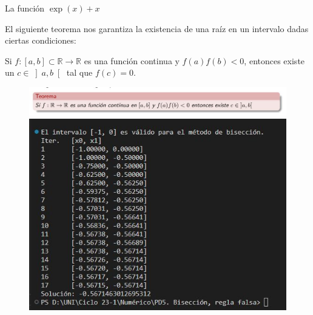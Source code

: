 \begin{frame}
	\begin{solution}
		La función
		\begin{math}
			\exp\left(x\right)+x
		\end{math}

		El siguiente teorema nos garantiza la existencia de una raíz en
		un intervalo dadas ciertas condiciones:
		\begin{theorem}
			Si
			\begin{math}
				f\colon
				\left[a,b\right]\subset\mathbb{R}\to
				\mathbb{R}
			\end{math}
			es una función continua y $f\left(a\right)f\left(b\right)<0$,
			entonces existe un $c\in\left]a,b\right[$ tal que
			$f\left(c\right)=0$.
		\end{theorem}

		\begin{figure}
			\includegraphics[width=0.5\paperwidth]{p14_teorema_existencia_sol.jpg}
			\includegraphics[width=0.5\paperwidth]{p14_bisection_execution.jpg}
		\end{figure}
	\end{solution}
\end{frame}



